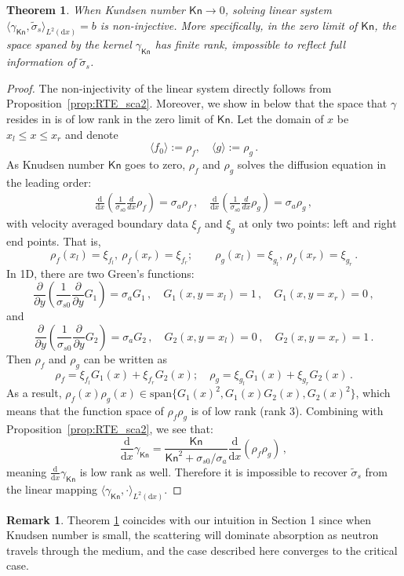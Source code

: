 \documentclass[english,reqno]{amsart}
\theoremstyle{plain}
\newtheorem{theorem}{Theorem}
\theoremstyle{definition} %
\newtheorem{remark}{Remark}
\newcommand{\rd}{\mathrm{d}}
\newcommand{\Kn}{\mathsf{Kn}}
\begin{document}
\begin{theorem}\label{thm:RTE_sca2}
When Kundsen number $\Kn \rightarrow 0$, solving linear system $\langle\gamma_\Kn,\tilde{\sigma}_s\rangle_{L^2(\rd{x})}=b$ is non-injective. More specifically, in the zero limit of $\Kn$, the space spaned by the kernel $\gamma_\Kn$ has finite rank, impossible to reflect full information of $\tilde{\sigma}_s$.
\end{theorem}
\begin{proof}
The non-injectivity of the linear system directly follows from Proposition~\ref{prop:RTE_sca2}. Moreover, we show in below that the space that $\gamma$ resides in is of low rank in the zero limit of $\Kn$. Let the domain of $x$ be $x_l \leq x \leq x_r$ and denote
\[
\langle f_0\rangle:= \rho_f, \quad \langle g \rangle := \rho_g\,.
\] 
As Knudsen number $\Kn$ goes to zero, $ \rho_f$ and $ \rho_g$ solves the diffusion equation in the leading order:
\[
\begin{aligned}
\frac{\rd}{\rd x} \left(\frac{1}{\sigma_{s0}}\frac{d}{dx}\rho_f \right)=\sigma_a \rho_f \,,   \quad
\frac{\rd}{\rd x} \left(\frac{1}{\sigma_{s0}}\frac{d}{dx} \rho_g \right)= \sigma_a \rho_g \,,
\end{aligned}
\]
with velocity averaged boundary data $\xi_f$ and $\xi_g$ at only two points: left and right end points. That is,
\[
\rho_f(x_l) = \xi_{f_l}, ~ \rho_f(x_r) = \xi_{f_r};  \qquad \rho_g(x_l) = \xi_{g_l}, ~ \rho_f(x_r) = \xi_{g_r}\,.
\]
In 1D, there are two Green's functions:
 \[
 \frac{\partial}{\partial y} \left(\frac{1}{\sigma_{s0}}\frac{\partial }{\partial y}G_1 \right)=\sigma_a G_1\,, \quad G_1(x,y=x_l) = 1\,,\quad G_1(x,y=x_r) = 0\,,
 \]
 and
 \[
 \frac{\partial}{\partial y} \left(\frac{1}{\sigma_{s0}}\frac{\partial }{\partial y}G_2 \right)=\sigma_a G_2\,, \quad G_2(x,y=x_l) = 0\,,\quad G_2(x,y=x_r) = 1\,.
 \]
Then $\rho_f$ and $\rho_g$ can be written as
\[
\rho_f = \xi_{f_l} G_1(x) + \xi_{f_r} G_2(x); \quad \rho_g = \xi_{g_l} G_1(x) + \xi_{g_r} G_2(x)\,.
\]
As a result, $\rho_f(x)\rho_g(x) \in \text{span}\{G_1(x)^2, G_1(x)G_2(x), G_2(x)^2\}$, which means that the function space of $\rho_f \rho_g$ is of low rank (rank 3). Combining with Proposition~\ref{prop:RTE_sca2}, we see that:
\begin{equation*}
\frac{\rd}{\rd x}\gamma_\Kn = \frac{\Kn}{\Kn^2+\sigma_{s0}/\sigma_a}\frac{\rd}{\rd x}\left(\rho_f\rho_g\right)\,,
\end{equation*}
meaning $\frac{\rd}{\rd x}\gamma_\Kn$ is low rank as well. Therefore it is impossible to recover $\tilde{\sigma}_s$ from the linear mapping $\langle \gamma_\Kn,\cdot \rangle_{L^2(\rd{x})}$.
\end{proof}
\begin{remark}
Theorem \ref{thm:RTE_sca2} coincides with our intuition in Section 1 since when Knudsen number is small, the scattering will dominate absorption as neutron travels through the medium, and the case described here converges to the critical case.
\end{remark}
\end{document}
